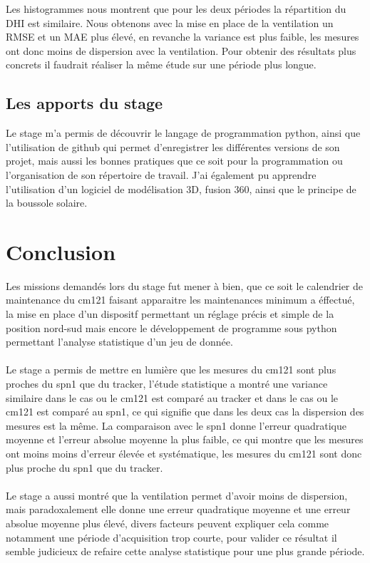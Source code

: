 \documentclass[12pt,a4paper]{article}
\begin{document}
\begin{flushleft}
Les histogrammes nous montrent que pour les deux périodes la répartition du DHI est similaire.
Nous obtenons avec la mise en place de la ventilation un RMSE et un MAE plus élevé, en revanche la variance est plus faible, les mesures ont donc moins de dispersion avec la ventilation. Pour obtenir des résultats plus concrets il faudrait réaliser la même étude sur une période plus longue.

\subsection{Les apports du stage}

Le stage m'a permis de découvrir le langage de programmation python, ainsi que l'utilisation de github qui permet d'enregistrer les différentes versions de son projet, mais aussi les bonnes pratiques que ce soit pour la programmation ou l'organisation de son répertoire de travail. J'ai également pu apprendre l'utilisation d'un logiciel de modélisation 3D, fusion 360, ainsi que le principe de la boussole solaire.


\section{Conclusion}

Les missions demandés lors du stage fut mener à bien, que ce soit le calendrier de maintenance du cm121 faisant apparaitre les maintenances minimum a éffectué, la mise en place d'un dispositf permettant un réglage précis et simple de la position nord-sud mais encore le développement de programme sous python permettant l'analyse statistique d'un jeu de donnée.\\
~\\
Le stage a permis de mettre en lumière que les mesures du cm121 sont plus proches du spn1 que du tracker, l'étude statistique a montré une variance similaire dans le cas ou le cm121 est comparé au tracker et dans le cas ou le cm121 est comparé au spn1, ce qui signifie que dans les deux cas la dispersion des mesures est la même. La comparaison avec le spn1 donne l'erreur quadratique  moyenne et l'erreur absolue moyenne la plus faible, ce qui montre que les mesures ont moins moins d'erreur élevée et systématique, les mesures du cm121 sont donc plus proche du spn1 que du tracker.\\
~\\
Le stage a aussi montré que la ventilation permet d'avoir moins de dispersion, mais paradoxalement elle donne une erreur quadratique moyenne et une erreur absolue moyenne plus élevé, divers facteurs peuvent expliquer cela comme notamment une période d'acquisition trop courte, pour valider ce résultat il semble judicieux de refaire cette analyse statistique pour une plus grande période.


\end{flushleft}
\end{document}
